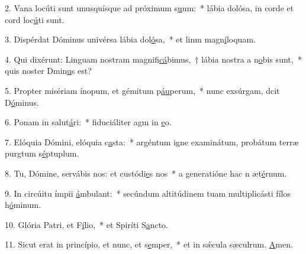 2. Vana locúti sunt unusquísque ad próximum s\uline{u}um:~* lábia dolósa, in corde et cord loc\uline{ú}ti sunt.\par 
3. Dispérdat Dóminus univérsa lábia dol\uline{ó}sa,~* et linm magn\uline{í}loquam.\par 
4. Qui dixérunt: Linguam nostram magnifi\uline{cá}bimus,~† lábia nostra a n\uline{o}bis sunt,~* quis noster Dmin\uline{u}s est?\par 
5. Propter misériam ínopum, et gémitum p\uline{áu}perum,~* nunc exsúrgam, dcit D\uline{ó}minus.\par 
6. Ponam in salut\uline{á}ri:~* fiduciáliter agm in \uline{e}o.\par 
7. Elóquia Dómini, elóquia c\uline{a}sta:~* argéntum igne examinátum, probátum terræ purgtum s\uline{é}ptuplum.\par 
8. Tu, Dómine, servábis nos: et custódi\uline{e}s nos~* a generatióne hac n æt\uline{é}rnum.\par 
9. In circúitu ímpii \uline{á}mbulant:~* secúndum altitúdinem tuam multiplicásti fílos h\uline{ó}minum.\par 
10. Glória Patri, et F\uline{í}lio,~* et Spiríti S\uline{a}ncto.\par 
11. Sicut erat in princípio, et nunc, et s\uline{e}mper,~* et in sǽcula sæculrum. \uline{A}men.\par 
